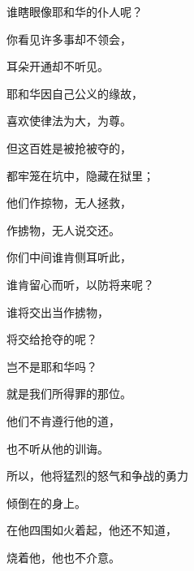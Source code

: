{\par }{\Q 谁瞎眼像耶和华的仆人呢？
\par }{\Q {}你看见许多事却不领会，
\par }{\Q 耳朵开通却不听见。
\par }{\Q {}耶和华因自己公义的缘故，
\par }{\Q 喜欢使律法为大，为尊。
\par }{\Q {}但这百姓是被抢被夺的，
\par }{\Q 都牢笼在坑中，隐藏在狱里；
\par }{\Q 他们作掠物，无人拯救，
\par }{\Q 作掳物，无人说交还。
\par }{\Q {}你们中间谁肯侧耳听此，
\par }{\Q 谁肯留心而听，以防将来呢？
\par }{\Q {}谁将{}交出当作掳物，
\par }{\Q 将{}交给抢夺的呢？
\par }{\Q 岂不是耶和华吗？
\par }{\Q 就是我们所得罪的那位。
\par }{\Q 他们不肯遵行他的道，
\par }{\Q 也不听从他的训诲。
\par }{\Q {}所以，他将猛烈的怒气和争战的勇力
\par }{\Q 倾倒在{}的身上。
\par }{\Q 在他四围如火着起，他还不知道，
\par }{\Q 烧着他，他也不介意。

}
